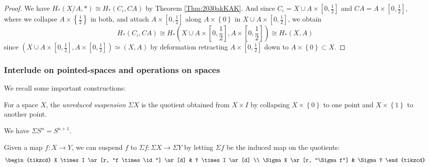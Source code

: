 \begin{proof}
    We have
    $H_* \left( X/A , *\right) \cong
    H_* \left( C_{\iota}, CA \right) $ by Theorem
    \ref{Thm:2030akKAK}. And since
    $C_{\iota} = X \cup A \times \left[ 0,\frac{1}{2} \right] $ 
    and $CA = A \times \left[ 0,\frac{1}{2} \right] $, where
    we collapse $A \times \left\{ \frac{1}{2} \right\} $ in
    both, and attach  $A \times \left[ 0,\frac{1}{2} \right] $ 
    along $A \times \left\{ 0 \right\} $ in
    $X \cup A \times \left[ 0,\frac{1}{2} \right] $, we obtain
    \[
    H_*(C_{\iota}, CA) \cong
    H_* \left( X \cup A \times \left[ 0,\frac{1}{2} \right] ,
    A \times \left[ 0, \frac{1}{2} \right] \right) 
    \cong H_* (X, A)
    \] 
    since 
    $\left( X \cup A \times \left[ 0,\frac{1}{2} \right] ,
    A \times \left[ 0,\frac{1}{2} \right] \right) 
    \simeq \left( X,A \right) $ by deformation retracting
    $A \times \left[ 0,\frac{1}{2} \right] $ down to
    $A \times \left\{ 0 \right\} \subset X$.
\end{proof}


\subsubsection{Interlude on pointed-spaces and
operations on spaces}

We recall some important constructions:

\begin{definition}
    For a space $X$, the \textit{unreduced suspension} 
    $\Sigma X$ is the
    quotient obtained from $X \times I$ by
    collapsing $X \times \left\{ 0 \right\} $ to one
    point and $X \times \left\{ 1 \right\} $ to another
    point.
\end{definition}

\begin{note}
    We have $\Sigma S^{n} = S^{n+1}$.
\end{note}



\begin{definition}
    Given a map
    $f \colon X \to Y$, we can suspend $f$ to
    $\Sigma f \colon \Sigma X \to \Sigma Y$
    by letting $\Sigma f$ be the induced
    map on the quotients:
    \begin{equation*}
    \begin{tikzcd}
        X \times I \ar[r, "f \times \id"] \ar[d]  & Y \times I \ar[d] \\
        \Sigma X \ar[r, "\Sigma f"] & \Sigma Y
    \end{tikzcd}
    \end{equation*}
    
\end{definition}

